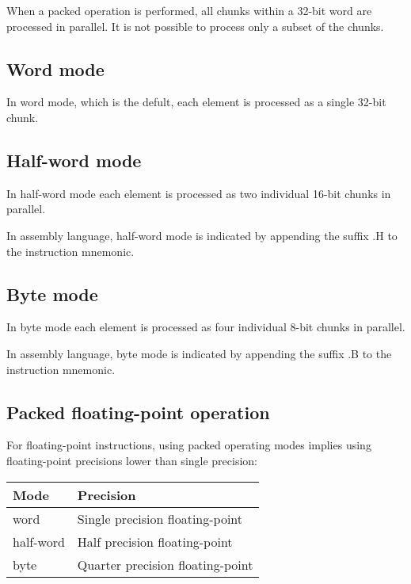 When a packed operation is performed, all chunks within a 32-bit word are
processed in parallel. It is not possible to process only a subset of the
chunks.

\subsection{Word mode}

In word mode, which is the defult, each element is processed as a single
32-bit chunk.

\subsection{Half-word mode}

In half-word mode each element is processed as two individual 16-bit chunks in
parallel.

In assembly language, half-word mode is indicated by appending the suffix .H
to the instruction mnemonic.

\subsection{Byte mode}

In byte mode each element is processed as four individual 8-bit chunks in
parallel.

In assembly language, byte mode is indicated by appending the suffix .B to the
instruction mnemonic.

\subsection{Packed floating-point operation}

For floating-point instructions, using packed operating modes implies using
floating-point precisions lower than single precision:

\begin{tabular}{|l|l|}
  \hline
  \textbf{Mode} & \textbf{Precision} \\
  \hline
  word & Single precision floating-point \\
  \hline
  half-word & Half precision floating-point \\
  \hline
  byte & Quarter precision floating-point \\
  \hline
\end{tabular}
